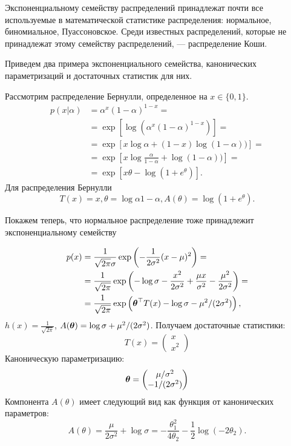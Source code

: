 Экспоненциальному семейству распределений принадлежат почти все используемые в математической статистике распределения: нормальное, биномиальное, Пуассоновское.
Среди известных распределений, которые не принадлежат этому семейству распределений, --- распределение Коши.

Приведем два примера экспоненциального семейства, канонических параметризаций и достаточных статистик для них.
\begin{example}
Рассмотрим распределение Бернулли, определенное на $x \in \{0, 1\}$.
\begin{align*}
p(x | \alpha) &= \alpha^{x} (1 - \alpha)^{1 - x} = \\
&= \exp \left[\log (\alpha^{x} (1 - \alpha)^{1 - x}) \right] = \\
&= \exp \left[x \log \alpha + (1 - x) \log (1 - \alpha)) \right] = \\
&= \exp \left[x \log \frac{\alpha}{1 - \alpha} + \log (1 - \alpha)) \right] = \\
&= \exp \left[x \theta - \log (1 + e^{\theta})\right].
\end{align*}
Для распределения Бернулли 
\[
T(x) = x, \theta = \log {\alpha}{1 - \alpha}, A(\theta) = \log (1 + e^{\theta}).
\]
\end{example}

Покажем теперь, что нормальное распределение тоже принадлежит экспоненциальному семейству
\begin{example}
\begin{align*}
p(x) &= \frac{1}{\sqrt{2 \pi} \sigma} \exp \left(-\frac{1}{2 \sigma^2} (x - \mu)^2 \right) =\\
     &= \frac{1}{\sqrt{2 \pi}} \exp \left(-\log \sigma - \frac{x^2}{2 \sigma^2} + \frac{\mu x}{\sigma^2} - \frac{\mu^2}{2 \sigma^2} \right) = \\
    &= \frac{1}{\sqrt{2 \pi}} \exp \left( \boldsymbol{\theta}^\top T(x) - \log \sigma - \mu^2 / (2 \sigma^2) \right),
\end{align*}
$h(x) = \frac{1}{\sqrt{2 \pi}}$, $A(\boldsymbol{\theta}) = \log \sigma + \mu^2 / (2 \sigma^2)$.
Получаем достаточные статистики:
\[
T(x) = \begin{pmatrix}
x \\
x^2 
\end{pmatrix}
\]
Каноническую параметризацию:
\[
\boldsymbol{\theta} = \begin{pmatrix}
\mu / \sigma^2 \\
-1 / (2 \sigma^2)
\end{pmatrix}
\]
Компонента $A(\theta)$ имеет следующий вид как функция от канонических параметров:
\[
A(\theta) = \frac{\mu}{2 \sigma^2} + \log \sigma = - \frac{\theta_1^2}{4 \theta_2} - \frac12 \log (-2\theta_2).
\]
\end{example}

